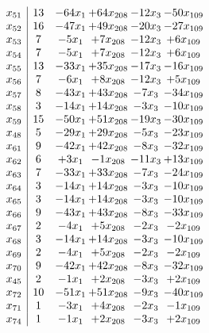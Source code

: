 \documentclass[11pt]{article}
\begin{document}
\[\begin{array}{c| c c@{\hskip 2pt} c@{\hskip 2pt} c@{\hskip 2pt} c@{\hskip 2pt} }
 x_{51}   &  13 & -64 x_{1} & + 64 x_{208} & -12 x_{3} & -50 x_{109}\\
 x_{52}   &  16 & -47 x_{1} & + 49 x_{208} & -20 x_{3} & -27 x_{109}\\
 x_{53}   &  7 & -5 x_{1} & + 7 x_{208} & -12 x_{3} & + 6 x_{109}\\
 x_{54}   &  7 & -5 x_{1} & + 7 x_{208} & -12 x_{3} & + 6 x_{109}\\
 x_{55}   &  13 & -33 x_{1} & + 35 x_{208} & -17 x_{3} & -16 x_{109}\\
 x_{56}   &  7 & -6 x_{1} & + 8 x_{208} & -12 x_{3} & + 5 x_{109}\\
 x_{57}   &  8 & -43 x_{1} & + 43 x_{208} & -7 x_{3} & -34 x_{109}\\
 x_{58}   &  3 & -14 x_{1} & + 14 x_{208} & -3 x_{3} & -10 x_{109}\\
 x_{59}   &  15 & -50 x_{1} & + 51 x_{208} & -19 x_{3} & -30 x_{109}\\
 x_{48}   &  5 & -29 x_{1} & + 29 x_{208} & -5 x_{3} & -23 x_{109}\\
 x_{61}   &  9 & -42 x_{1} & + 42 x_{208} & -8 x_{3} & -32 x_{109}\\
 x_{62}   &  6 & + 3 x_{1} & -1 x_{208} & -11 x_{3} & + 13 x_{109}\\
 x_{63}   &  7 & -33 x_{1} & + 33 x_{208} & -7 x_{3} & -24 x_{109}\\
 x_{64}   &  3 & -14 x_{1} & + 14 x_{208} & -3 x_{3} & -10 x_{109}\\
 x_{65}   &  3 & -14 x_{1} & + 14 x_{208} & -3 x_{3} & -10 x_{109}\\
 x_{66}   &  9 & -43 x_{1} & + 43 x_{208} & -8 x_{3} & -33 x_{109}\\
 x_{67}   &  2 & -4 x_{1} & + 5 x_{208} & -2 x_{3} & -2 x_{109}\\
 x_{68}   &  3 & -14 x_{1} & + 14 x_{208} & -3 x_{3} & -10 x_{109}\\
 x_{69}   &  2 & -4 x_{1} & + 5 x_{208} & -2 x_{3} & -2 x_{109}\\
 x_{70}   &  9 & -42 x_{1} & + 42 x_{208} & -8 x_{3} & -32 x_{109}\\
 x_{45}   &  2 & -1 x_{1} & + 2 x_{208} & -3 x_{3} & + 2 x_{109}\\
 x_{72}   &  10 & -51 x_{1} & + 51 x_{208} & -9 x_{3} & -40 x_{109}\\
 x_{71}   &  1 & -3 x_{1} & + 4 x_{208} & -2 x_{3} & -1 x_{109}\\
 x_{74}   &  1 & -1 x_{1} & + 2 x_{208} & -3 x_{3} & + 2 x_{109}\\

\end{array}\]
\end{document}
